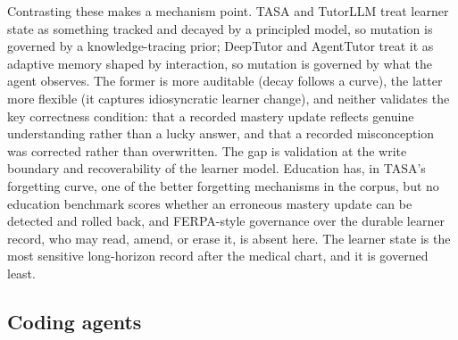 Contrasting these makes a mechanism point. TASA and TutorLLM treat learner state as something tracked and decayed by a principled model, so mutation is governed by a knowledge-tracing prior; DeepTutor and AgentTutor treat it as adaptive memory shaped by interaction, so mutation is governed by what the agent observes. The former is more auditable (decay follows a curve), the latter more flexible (it captures idiosyncratic learner change), and neither validates the key correctness condition: that a recorded mastery update reflects genuine understanding rather than a lucky answer, and that a recorded misconception was corrected rather than overwritten. The gap is validation at the write boundary and recoverability of the learner model. Education has, in TASA's forgetting curve, one of the better forgetting mechanisms in the corpus, but no education benchmark scores whether an erroneous mastery update can be detected and rolled back, and FERPA-style governance over the durable learner record, who may read, amend, or erase it, is absent here. The learner state is the most sensitive long-horizon record after the medical chart, and it is governed least.

\subsection{Coding agents}

